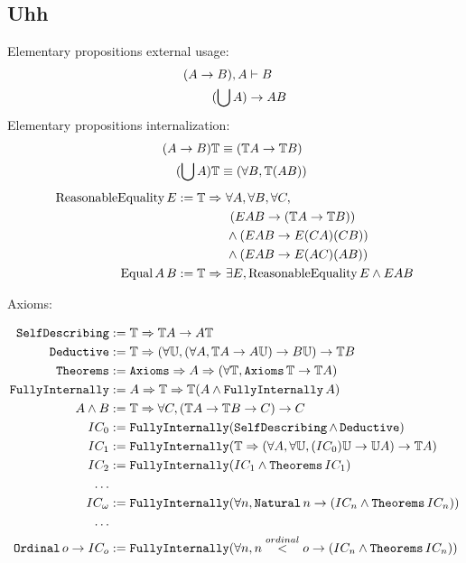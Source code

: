 \documentclass{article}
\begin{document}
  \subsection{Uhh}
  Elementary propositions external usage:
  \begin{align*}
    (A \to B), A &\vdash B\\
    (\bigcup A) &\to AB\\
  \end{align*}
  Elementary propositions internalization:
  \begin{align*}
    (A \to B)\mathbb{T} &\equiv (\mathbb{T}A \to \mathbb{T}B)\\
    (\bigcup A)\mathbb{T} &\equiv (\forall B, \mathbb{T}(AB))\\
  \end{align*}
  \begin{align*}
    \mathrm{ReasonableEquality}\,E := \nameabst{\mathbb{T}}\ &\forall A, \forall B, \forall C,\\
      &\ (EAB \to (\mathbb{T}A \to \mathbb{T}B))\\
      &\wedge (EAB \to E(CA)(CB))\\
      &\wedge (EAB \to E(AC)(AB))\\
    \mathrm{Equal}\,A\,B := \nameabst{\mathbb{T}}\ &\exists E, \mathrm{ReasonableEquality}\,E \wedge EAB
  \end{align*}
  
  Axioms:
  
  \begin{align*}
    \operatorname{\texttt{SelfDescribing}} &:= \mathbb{T} \Rightarrow \mathbb{T}A \to A\mathbb{T}\\
    \operatorname{\texttt{Deductive}} &:= \mathbb{T} \Rightarrow (\forall \mathbb{U}, (\forall A, \mathbb{T}A \to A\mathbb{U}) \to B\mathbb{U}) \to \mathbb{T}B\\
    \operatorname{\texttt{Theorems}} &:= \operatorname{\texttt{Axioms}} \Rightarrow A \Rightarrow (\forall \mathbb{T}, \operatorname{\texttt{Axioms}} \mathbb{T} \to \mathbb{T}A) \\ 
    \operatorname{\texttt{FullyInternally}} &:= A \Rightarrow \mathbb{T} \Rightarrow \mathbb{T} (A \wedge \operatorname{\texttt{FullyInternally}} A)\\
    A \wedge B &:= \mathbb{T} \Rightarrow \forall C, (\mathbb{T}A \to \mathbb{T}B \to C) \to C\\
    IC_0 &:= \operatorname{\texttt{FullyInternally}}(\operatorname{\texttt{SelfDescribing}} \wedge \operatorname{\texttt{Deductive}})\\
    IC_1 &:= \operatorname{\texttt{FullyInternally}}(\mathbb{T} \Rightarrow (\forall A, \forall \mathbb{U}, (IC_0)\mathbb{U} \to \mathbb{U}{A}) \to \mathbb{T}A)\\
    IC_2 &:= \operatorname{\texttt{FullyInternally}}(IC_1 \wedge \operatorname{\texttt{Theorems}} IC_1)\\
    \dots \\
    IC_\omega &:= \operatorname{\texttt{FullyInternally}}(\forall n, \operatorname{\texttt{Natural}} n \to (IC_n \wedge \operatorname{\texttt{Theorems}} IC_n))\\
    \dots \\
    \operatorname{\texttt{Ordinal}} o \to IC_o &:= \operatorname{\texttt{FullyInternally}}(\forall n, n \stackrel{ordinal}{<} o \to (IC_n \wedge \operatorname{\texttt{Theorems}} IC_n))\\
  \end{align*}
  
\end{document}
